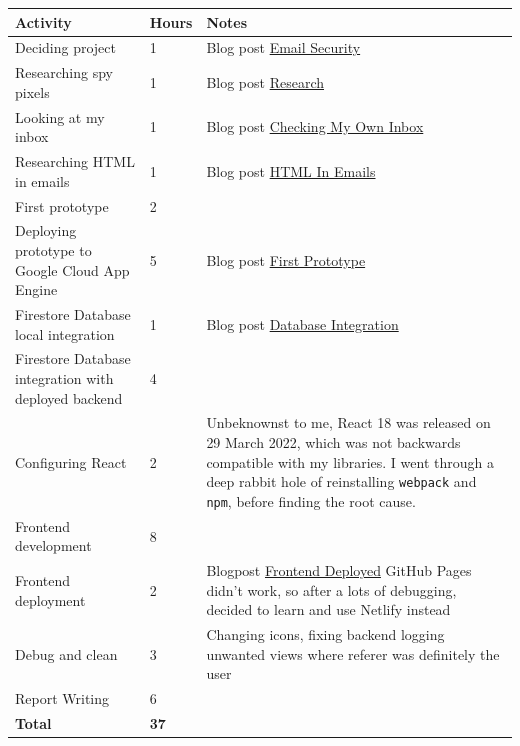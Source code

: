 \documentclass{article}
\begin{document}
\begin{center}
\begin{tabular}{ |m{}|l|m{}| }
    \hline
    \textbf{Activity} & \textbf{Hours} & \textbf{Notes} \\ 
    \hline\hline
    Deciding project & 1 & Blog post \href{https://www.openlearning.com/u/hayeschoy-r7a9ti/blog/SomethingAwesomeEmailSecurity/}{Email Security} \\  
    \hline
    Researching spy pixels & 1 & Blog post \href{https://www.openlearning.com/u/hayeschoy-r7a9ti/blog/SomethingAwesomeResearch3March/}{Research} \\
    \hline
    Looking at my inbox & 1 & Blog post \href{https://www.openlearning.com/u/hayeschoy-r7a9ti/blog/SomethingAwesomeCheckingMyOwnInbox10March/}{Checking My Own Inbox} \\
    \hline
    Researching HTML in emails & 1 & Blog post \href{https://www.openlearning.com/u/hayeschoy-r7a9ti/blog/SomethingAwesomeHtmlInEmails22March/}{HTML In Emails} \\
    \hline
    First prototype & 2 &  \\
    \hline
    Deploying prototype to Google Cloud App Engine & 5 & Blog post \href{https://www.openlearning.com/u/hayeschoy-r7a9ti/blog/SomethingAwesomeFirstPrototype/}{First Prototype} \\
    \hline
    Firestore Database local integration & 1 & Blog post \href{https://www.openlearning.com/u/hayeschoy-r7a9ti/blog/SomethingAwesomeDatabaseIntegration/}{Database Integration} \\
    \hline
    Firestore Database integration with deployed backend & 4 & \\
    \hline
    Configuring React & 2 & Unbeknownst to me, React 18 was released on 29 March 2022, which was not backwards compatible with my libraries. I went through a deep rabbit hole of reinstalling \texttt{webpack} and \texttt{npm}, before finding the root cause. \\
    \hline
    Frontend development & 8 &  \\
    \hline
    Frontend deployment & 2 & Blogpost \href{https://www.openlearning.com/u/hayeschoy-r7a9ti/blog/SomethingAwesomeFrontendDeployed/}{Frontend Deployed} \newline GitHub Pages didn't work, so after a lots of debugging, decided to learn and use Netlify instead \\
    \hline
    Debug and clean & 3 & Changing icons, fixing backend logging unwanted views where referer was definitely the user \\
    \hline
    Report Writing & 6 & \\   
    \hline\hline
    
    \textbf{Total} & \textbf{37} & \\
    \hline
\end{tabular}
\end{center}
\end{document}
